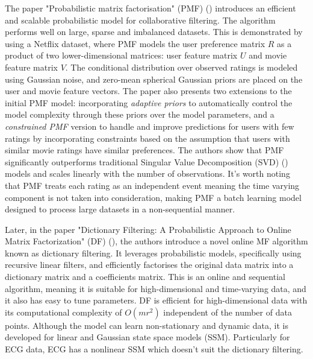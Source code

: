 \documentclass{mldsmsc}
\begin{document}
\noindent The paper "Probabilistic matrix factorisation" (PMF) (\cite{NIPS2007_d7322ed7}) introduces an efficient and scalable probabilistic model for collaborative filtering. The algorithm performs well on large, sparse and imbalanced datasets. This is demonstrated by using a Netflix dataset, where PMF models the user preference matrix $R$ as a product of two lower-dimensional matrices: user feature matrix $U$ and movie feature matrix $V$. The conditional distribution over observed ratings is modeled using Gaussian noise, and zero-mean spherical Gaussian priors are placed on the user and movie feature vectors. The paper also presents two extensions to the initial PMF model: incorporating \textit{adaptive priors} to automatically control the model complexity through these priors over the model parameters, and a \textit{constrained PMF} version to handle and improve predictions for users with few ratings by incorporating constraints based on the assumption that users with similar movie ratings have similar preferences. The authors show that PMF significantly outperforms traditional Singular Value Decomposition (SVD) (\cite{4ba978eb-d878-342d-a11e-6d7554474b2d}) models and scales linearly with the number of observations. It's worth noting that PMF treats each rating as an independent event meaning the time varying component is not taken into consideration, making PMF a batch learning model designed to process large datasets in a non-sequential manner. \newline

\noindent Later, in the paper "Dictionary Filtering: A Probabilistic Approach to Online Matrix Factorization" (DF) (\cite{cite-key}), the authors introduce a novel online MF algorithm known as dictionary filtering. It leverages probabilistic models, specifically using recursive linear filters, and efficiently factorises the original data matrix into a dictionary matrix and a coefficients matrix. This is an online and sequential algorithm, meaning it is suitable for high-dimensional and time-varying data, and it also has easy to tune parameters. DF is efficient for high-dimensional data with its computational complexity of $O(mr^2)$ independent of the number of data points. Although the model can learn non-stationary and dynamic data, it is developed for linear and Gaussian state space models (SSM). Particularly for ECG data, ECG has a nonlinear SSM which doesn't suit the dictionary filtering. \newline
\end{document}
